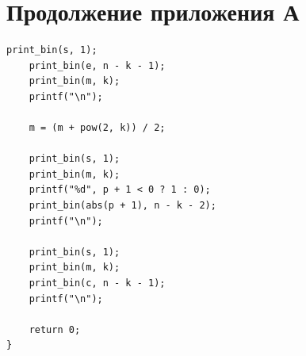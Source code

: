 \documentclass[a4paper,14pt]{extarticle}
\begin{document}
	\pagebreak
	\section*{Продолжение приложения А}
	\begin{lstlisting}[tabsize=2,basicstyle=\ttfamily]
	print_bin(s, 1);
	print_bin(e, n - k - 1);
	print_bin(m, k);
	printf("\n");
	
	m = (m + pow(2, k)) / 2;
	
	print_bin(s, 1);
	print_bin(m, k);
	printf("%d", p + 1 < 0 ? 1 : 0);
	print_bin(abs(p + 1), n - k - 2);
	printf("\n");
	
	print_bin(s, 1);
	print_bin(m, k);
	print_bin(c, n - k - 1);
	printf("\n");
	
	return 0;
}
	\end{lstlisting}
	
\end{document}
